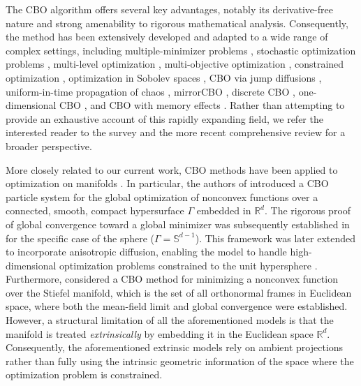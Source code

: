 \documentclass[11pt]{amsart}
\begin{document}
The CBO algorithm offers several key advantages, notably its derivative-free nature and   strong amenability to rigorous mathematical analysis. Consequently, the method has been extensively developed and adapted to a wide range of complex settings, including multiple-minimizer problems \cite{bungert2025polarized}, stochastic optimization problems \cite{bellavia2025discrete}, multi-level optimization \cite{herty2025multiscale}, multi-objective optimization \cite{borghi2023adaptive}, constrained optimization \cite{beddrich2026constrained}, optimization in Sobolev spaces \cite{khatab2026consensus}, CBO via jump diffusions \cite{kalise2023consensus},  uniform-in-time propagation of chaos \cite{gerber2025uniform, ha2026uniform}, mirrorCBO \cite{bungert2025mirrorcbo}, discrete CBO \cite{ha2024time,ha2020convergence,ko2022convergence}, one-dimensional CBO \cite{choi2022one}, and CBO with memory effects \cite{riedl2024leveraging}.  Rather than attempting to provide an exhaustive account of this rapidly expanding field, we refer the interested reader to the survey \cite{totzeck2021trends} and the more recent comprehensive review \cite{byeon2025consensus,fornasier2026consensus} for a broader perspective.


More closely related to our current work, CBO methods have been applied to optimization on manifolds \cite{fornasier2020consensus,fornasier2021JMLR,fornasier2022anisotropic,ha2022stochastic}. In particular, the authors of \cite{fornasier2020consensus} introduced a CBO particle system for the global optimization of nonconvex functions over a connected, smooth, compact hypersurface $\Gamma$ embedded in $\mathbb{R}^d$. The rigorous proof of global convergence toward a global minimizer was subsequently established in \cite{fornasier2021JMLR} for the specific case of the sphere ($\Gamma=\mathbb{S}^{d-1}$). This framework was later extended to incorporate anisotropic diffusion, enabling the model to handle high-dimensional optimization problems constrained to the unit hypersphere \cite{fornasier2022anisotropic}. Furthermore, \cite{ha2022stochastic} considered a CBO method for minimizing a nonconvex function over the Stiefel manifold, which is the set of all orthonormal frames in Euclidean space, where both the mean-field limit and global convergence were established. However, a structural limitation of all the aforementioned models is that  the manifold is treated \emph{extrinsically} by embedding it in the Euclidean space $\mathbb{R}^d$. Consequently, the aforementioned extrinsic models  rely on ambient projections rather than fully using the intrinsic geometric information of the space where the optimization problem is constrained.
\medskip
\end{document}
